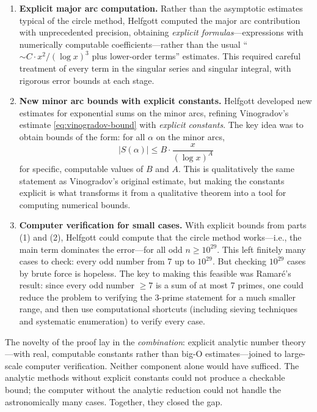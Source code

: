 \begin{enumerate}
\item \textbf{Explicit major arc computation.} Rather than the asymptotic estimates typical of the circle method, Helfgott computed the major arc contribution with unprecedented precision, obtaining \emph{explicit formulas}---expressions with numerically computable coefficients---rather than the usual ``$\sim C \cdot x^2 / (\log x)^3$ plus lower-order terms'' estimates. This required careful treatment of every term in the singular series and singular integral, with rigorous error bounds at each stage.

\item \textbf{New minor arc bounds with explicit constants.} Helfgott developed new estimates for exponential sums on the minor arcs, refining Vinogradov's estimate \eqref{eq:vinogradov-bound} with \emph{explicit constants}. The key idea was to obtain bounds of the form: for all $\alpha$ on the minor arcs,
\[
|S(\alpha)| \leq B \cdot \frac{x}{(\log x)^A}
\]
for specific, computable values of $B$ and $A$. This is qualitatively the same statement as Vinogradov's original estimate, but making the constants explicit is what transforms it from a qualitative theorem into a tool for computing numerical bounds.

\item \textbf{Computer verification for small cases.} With explicit bounds from parts (1) and (2), Helfgott could compute that the circle method works---i.e., the main term dominates the error---for all odd $n \geq 10^{29}$. This left finitely many cases to check: every odd number from 7 up to $10^{29}$. But checking $10^{29}$ cases by brute force is hopeless. The key to making this feasible was Ramar\'e's result: since every odd number $\geq 7$ is a sum of at most 7 primes, one could reduce the problem to verifying the 3-prime statement for a much smaller range, and then use computational shortcuts (including sieving techniques and systematic enumeration) to verify every case.
\end{enumerate}

The novelty of the proof lay in the \emph{combination}: explicit analytic number theory---with real, computable constants rather than big-O estimates---joined to large-scale computer verification. Neither component alone would have sufficed. The analytic methods without explicit constants could not produce a checkable bound; the computer without the analytic reduction could not handle the astronomically many cases. Together, they closed the gap.

